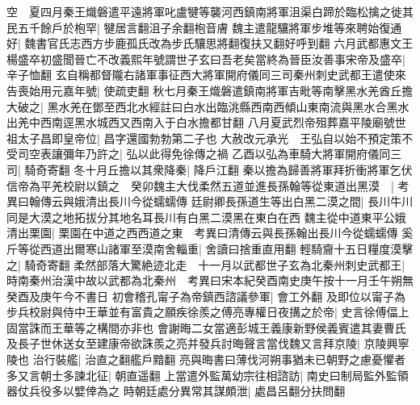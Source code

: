 空　夏四月秦王熾磐遣平遠將軍叱盧犍等襲河西鎮南將軍沮渠白蹄於臨松擒之徙其民五千餘戶於枹罕|{
	犍居言翻沮子余翻枹音膚}
魏主遣龍驤將軍步堆等來聘始復通好|{
	魏書官氏志西方步鹿孤氏改為步氏驤思將翻復扶又翻好呼到翻}
六月武都惠文王楊盛卒初盛聞晉亡不改義熙年號謂世子玄曰吾老矣當終為晉臣汝善事宋帝及盛卒|{
	辛子恤翻}
玄自稱都督隴右諸軍事征西大將軍開府儀同三司秦州刺史武都王遣使來告喪始用元嘉年號|{
	使疏吏翻}
秋七月秦王熾磐遣鎮南將軍吉毗等南擊黑水羌酋丘擔大破之|{
	黑水羌在鄧至西北水經註曰白水出臨洮縣西南西傾山東南流與黑水合黑水出羌中西南逕黑水城西又西南入于白水擔都甘翻}
八月夏武烈帝殂葬嘉平陵廟號世祖太子昌即皇帝位|{
	昌字還國勃勃第二子也}
大赦改元承光　王弘自以始不預定策不受司空表讓彌年乃許之|{
	弘以此得免徐傳之禍}
乙酉以弘為車騎大將軍開府儀同三司|{
	騎奇寄翻}
冬十月丘擔以其衆降秦|{
	降戶江翻}
秦以擔為歸善將軍拜折衝將軍乞伏信帝為平羌校尉以鎮之　癸卯魏主大伐柔然五道並進長孫翰等從東道出黑漠　|{
	考異曰翰傳云與娥清出長川今從蠕蠕傳}
廷尉卿長孫道生等出白黑二漠之間|{
	長川牛川同是大漠之地拓拔分其地名耳長川有白黑二漠黑在東白在西}
魏主從中道東平公娥清出栗園|{
	栗園在中道之西西道之東　考異曰清傳云與長孫翰出長川今從蠕蠕傳}
奚斤等從西道出爾寒山諸軍至漠南舍輜重|{
	舍讀曰捨重直用翻}
輕騎齎十五日糧度漠擊之|{
	騎奇寄翻}
柔然部落大驚絶迹北走　十一月以武都世子玄為北秦州刺史武都王|{
	時南秦州治漢中故以武都為北秦州　考異曰宋本紀癸酉南史庚午按十一月壬午朔無癸酉及庚午今不書日}
初會稽孔甯子為帝鎮西諮議參軍|{
	會工外翻}
及即位以甯子為步兵校尉與侍中王華並有富貴之願疾徐羨之傅亮專權日夜搆之於帝|{
	史言徐傅偪上固當誅而王華等之構間亦非也}
會謝晦二女當適彭城王義康新野侯義賓遣其妻曹氏及長子世休送女至建康帝欲誅羨之亮并發兵討晦聲言當伐魏又言拜京陵|{
	京陵興寧陵也}
治行裝艦|{
	治直之翻艦戶黯翻}
亮與晦書曰薄伐河朔事猶未已朝野之慮憂懼者多又言朝士多諫北征|{
	朝直遥翻}
上當遣外監萬幼宗往相諮訪|{
	南史曰制局監外監領器仗兵役多以嬖倖為之}
時朝廷處分異常其謀頗泄|{
	處昌呂翻分扶問翻}


